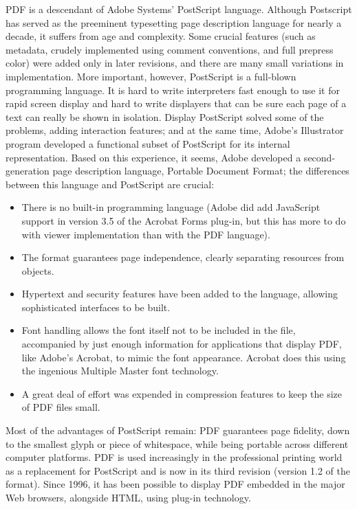 

PDF is a descendant of Adobe Systems' PostScript language. Although
Postscript has served as the preeminent typesetting page description
language for nearly a decade, it suffers from age and complexity. Some
crucial features (such as metadata, crudely implemented using comment
conventions, and full prepress color) were added only in later
revisions, and there are many small variations in implementation. More
important, however, PostScript is a full-blown programming language.  It
is hard to write interpreters fast enough to use it for rapid screen
display and hard to write displayers that can be sure each page of a
text can really be shown in isolation. Display PostScript solved some of
the problems, adding interaction features; and at the same time, Adobe's
Illustrator program developed a functional subset of PostScript for its
internal representation. Based on this experience, it seems, Adobe
developed a second-generation page description language, Portable
Document Format; the differences between this language and PostScript
are crucial: 

\begin{itemize}
  \item There is no built-in programming language (Adobe did add JavaScript support 
    in version 3.5 of the Acrobat Forms plug-in, but this has more to do with viewer 
    implementation than with the PDF language). 
  \item The format guarantees page independence, clearly separating resources from 
    objects. 
  \item Hypertext and security features have been added to the language, allowing sophisticated interfaces to be built. 
  \item Font handling allows the font itself not to be included in the file, accompanied by just enough information for applications that display PDF, like Adobe's Acrobat, to mimic the font appearance. Acrobat does this using the ingenious 
    Multiple Master font technology. 
  \item A great deal of effort was expended in compression features to keep the size of 
    PDF files small. 
\end{itemize}

Most of the advantages of PostScript remain: PDF guarantees page
fidelity, down to the smallest glyph or piece of whitespace, while being
portable across different computer platforms. PDF is used increasingly
in the professional printing world as a replacement for PostScript and
is now in its third revision (version 1.2 of the format). Since 1996, it
has been possible to display PDF embedded in the major Web browsers,
alongside HTML, using plug-in technology. 

